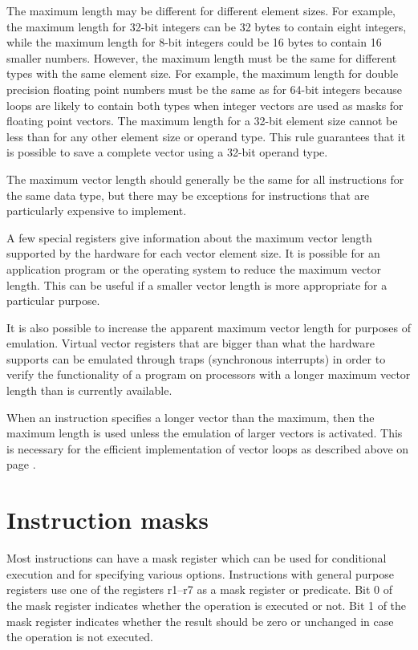 \documentclass[forwardcom.tex]{subfiles}
\begin{document}
The maximum length may be different for different element sizes. For example, the maximum length for 32-bit integers can be 32 bytes to contain eight integers, while the maximum length for 8-bit integers could be 16 bytes to contain 16 smaller numbers. However, the maximum length must be the same for different types with the same element size. For example, the maximum length for double precision floating point numbers must be the same as for 64-bit integers because loops are likely to contain both types when integer vectors are used as masks for floating point vectors. The maximum length for a 32-bit element size cannot be less than for any other element size or operand type. This rule guarantees that it is possible to save a complete vector using a 32-bit operand type.
\vspace{2mm}

The maximum vector length should generally be the same for all instructions for the same data type, but there may be exceptions for instructions that are particularly expensive to implement. 
\vspace{2mm}

A few special registers give information about the maximum vector length supported by the hardware for each vector element size. It is possible for an application program or the operating system to reduce the maximum vector length. This can be useful if a smaller vector length is more appropriate for a particular purpose.
\vspace{2mm}

It is also possible to increase the apparent maximum vector length for purposes of emulation. Virtual vector registers that are bigger than what the hardware supports can be emulated through traps (synchronous interrupts) in order to verify the functionality of a program on processors with a longer maximum vector length than is currently available.
\vspace{2mm}

When an instruction specifies a longer vector than the maximum, then the maximum length is used unless the emulation of larger vectors is activated. This is necessary for the efficient implementation of vector loops as described above on page \pageref{vectorLoops}.

\section{Instruction masks}
Most instructions can have a mask register which can be used for conditional execution and for specifying various options. Instructions with general purpose registers use one of the registers r1--r7 as a mask register or predicate. Bit 0 of the mask register indicates whether the operation is executed or not. Bit 1 of the mask register indicates whether the result should be zero or unchanged in case the operation is not executed.
\vspace{2mm}
\end{document}
